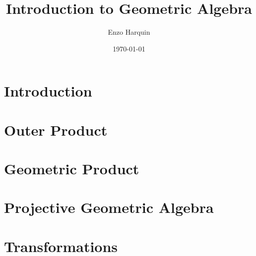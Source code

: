 



\title{Introduction to Geometric Algebra}
\author[Harquin]{Enzo Harquin}
\date{\today}




\begin{frame}
    \titlepage
\end{frame}

\section{Introduction}



\section{Outer Product}


\section{Geometric Product}


\section{Projective Geometric Algebra}




\section{Transformations}



